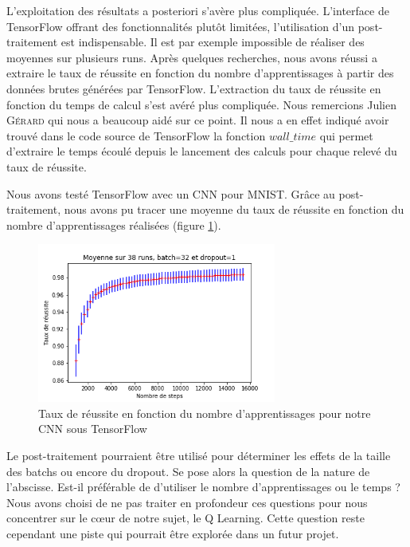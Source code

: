 L'exploitation des résultats a posteriori s'avère plus compliquée. L'interface de TensorFlow offrant des fonctionnalités plutôt limitées, l'utilisation d'un post-traitement est indispensable. Il est par exemple impossible de réaliser des moyennes sur plusieurs runs. Après quelques recherches, nous avons réussi a extraire le taux de réussite en fonction du nombre d'apprentissages à partir des données brutes générées par TensorFlow. L'extraction du taux de réussite en fonction du temps de calcul s'est avéré plus compliquée. Nous remercions Julien \textsc{Gérard} qui nous a beaucoup aidé sur ce point. Il nous a en effet indiqué avoir trouvé dans le code source de TensorFlow la fonction $wall\_time$ qui permet d'extraire le temps écoulé depuis le lancement des calculs pour chaque relevé du taux de réussite.

Nous avons testé TensorFlow avec un CNN pour MNIST. Grâce au post-traitement, nous avons pu tracer une moyenne du taux de réussite en fonction du nombre d'apprentissages réalisées (figure \ref{fig:tb_post_traitement}).

\begin{figure}[h]
 \centering
 \includegraphics[width=0.7\textwidth]{img/tb_post_traitement.png}
 \caption{Taux de réussite en fonction du nombre d'apprentissages pour notre CNN sous TensorFlow}
 \label{fig:tb_post_traitement}
\end{figure}

Le post-traitement pourraient être utilisé pour déterminer les effets de la taille des batchs ou encore du dropout. Se pose alors la question de la nature de l’abscisse. Est-il préférable de d'utiliser le nombre d'apprentissages ou le temps ?
Nous avons choisi de ne pas traiter en profondeur ces questions pour nous concentrer sur le c\oe ur de notre sujet, le Q Learning. Cette question reste cependant une piste qui pourrait être explorée dans un futur projet.
